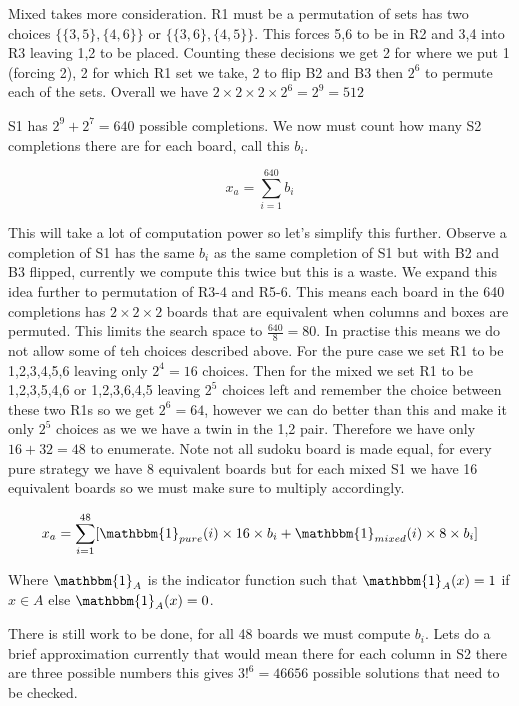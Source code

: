 \documentclass[a4paper,11pt]{report}
\newcounter{col}
\begin{document}
Mixed takes more consideration. R1 must be a permutation of sets has two choices $\{\{3,5\},\{4,6\}\}$ or $\{\{3,6\},\{4,5\}\}$. This forces 5,6 to be in R2 and 3,4 into R3 leaving 1,2 to be placed. Counting these decisions we get 2 for where we put 1 (forcing 2), 2 for which R1 set we take, 2 to flip B2 and B3 then $2^6$ to permute each of the sets. Overall we have $2\times 2 \times 2 \times 2^6=2^9=512$ 

S1 has $2^9+2^7=640$ possible completions. We now must count how many S2 completions there are for each board, call this $b_i$.

\begin{equation}x_a = \sum^{640}_{i=1}b_i\end{equation}

This will take a lot of computation power so let's simplify this further. Observe a completion of S1 has the same $b_i$ as the same completion of S1 but with B2 and B3 flipped, currently we compute this twice but this is a waste. We expand this idea further to permutation of R3-4 and R5-6. This means each board in the 640 completions has $2\times 2\times 2$ boards that are equivalent when columns and boxes are permuted. This limits the search space to $\frac{640}{8}=80$. In practise this means we do not allow some of teh choices described above. For the pure case we set R1 to be 1,2,3,4,5,6 leaving only $2^4=16$ choices. Then for the mixed we set R1 to be 1,2,3,5,4,6 or 1,2,3,6,4,5 leaving $2^5$ choices left and remember the choice between these two R1s so we get $2^6=64$, however we can do better than this and make it only $2^5$ choices as we we have a twin in the 1,2 pair. Therefore we have only $16+32=48$ to enumerate. Note not all sudoku board is made equal, for every pure strategy we have 8  equivalent boards but for each mixed S1 we have 16 equivalent boards so we must make sure to multiply accordingly. 

\begin{equation}x_a=\sum^{48}_{i=1}[\mathbbm{1}_{pure}(i)\times16\times b_i+\mathbbm{1}_{mixed}(i)\times8\times b_i]\end{equation}

Where $\mathbbm{1}_A$ is the indicator function such that $\mathbbm{1}_A(x) = 1$ if $x\in A$ else $\mathbbm{1}_A(x) = 0$.

There is still work to be done, for all 48 boards we must compute $b_i$. Lets do a brief approximation currently that would mean there for each column in S2 there are three possible numbers this gives $3!^6 = 46656$ possible solutions that need to be checked. 
\end{document}
